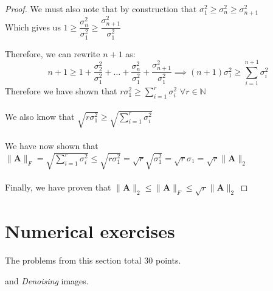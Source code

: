\documentclass[answers,10pt]{exam}
\newcommand{\B}[1]{\boldsymbol{#1}}
\begin{document}
\begin{questions}
\begin{solution}
\begin{parts}
\begin{proof}
 We must also note that by construction that $\sigma^2_1 \geq \sigma^2_n \geq \sigma^2_{n + 1}$\\
 Which gives us $1 \geq \dfrac{\sigma^2_n}{\sigma^2_1} \geq  \dfrac{\sigma^2_{n + 1}}{\sigma^2_1} $
 
 Therefore, we can rewrite $n + 1$ as: 
 $$
 n + 1 \geq 1 + \frac{\sigma_2^2}{\sigma_1^2} + \dots + \frac{\sigma_n^2}{\sigma_1^2} + \dfrac{\sigma^2_{n + 1}}{\sigma^2_1} \implies (n + 1)\sigma_1^2 \geq \sum_{i = 1}^{n + 1}\sigma_i^2
 $$
 Therefore we have shown that $r\sigma_1^2 \geq \sum_{i = 1}^r\sigma_i^2$ $\forall r\in\mathbb{N} $ \\\\
 
  We also know that $\sqrt{r\sigma_1^2} \geq \sqrt{\sum_{i = 1}^r\sigma_i^2}$ \\\\
 We have now shown that $\|\B{A}\|_F = \sqrt{\sum_{i = 1}^r\sigma_i^2} \leq \sqrt{r\sigma_1^2} = \sqrt{r}\sqrt{\sigma_1^2} = \sqrt{r}\sigma_1 = \sqrt{r}\|\B{A}\|_2$
 \\\\
 Finally, we have proven that $ \|\B{A}\|_2 \leq \|\B{A}\|_F \leq \sqrt{r} \|\B{A}\|_2$
 
 \end{proof}

 
 \end{parts}

\end{solution}

\section{Numerical exercises}

The problems from this section total $30$ points.  



 and {\em Denoising} images.  
\end{questions}
\end{document}
